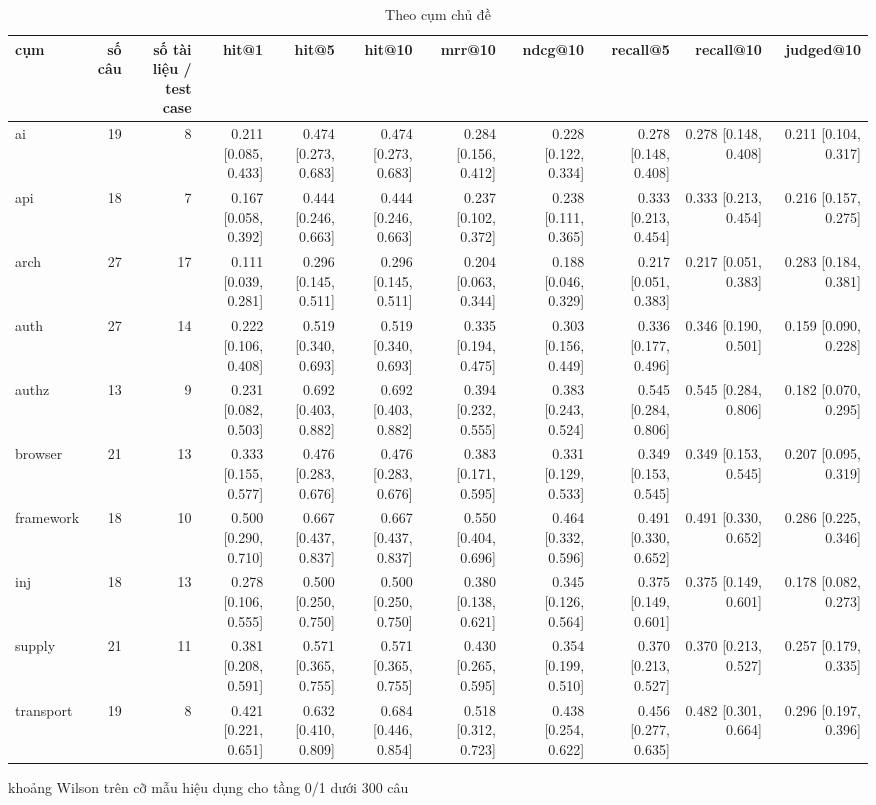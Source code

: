 \begin{table}[ht]
\centering
\caption{Theo cụm chủ đề}
\begin{tabular}{lrrrrrrrrrr}
\toprule
cụm & số câu & số tài liệu / test case & hit@1 & hit@5 & hit@10 & mrr@10 & ndcg@10 & recall@5 & recall@10 & judged@10 \\
\midrule
ai & 19 & 8 & 0.211 [0.085, 0.433] & 0.474 [0.273, 0.683] & 0.474 [0.273, 0.683] & 0.284 [0.156, 0.412] & 0.228 [0.122, 0.334] & 0.278 [0.148, 0.408] & 0.278 [0.148, 0.408] & 0.211 [0.104, 0.317] \\
api & 18 & 7 & 0.167 [0.058, 0.392] & 0.444 [0.246, 0.663] & 0.444 [0.246, 0.663] & 0.237 [0.102, 0.372] & 0.238 [0.111, 0.365] & 0.333 [0.213, 0.454] & 0.333 [0.213, 0.454] & 0.216 [0.157, 0.275] \\
arch & 27 & 17 & 0.111 [0.039, 0.281] & 0.296 [0.145, 0.511] & 0.296 [0.145, 0.511] & 0.204 [0.063, 0.344] & 0.188 [0.046, 0.329] & 0.217 [0.051, 0.383] & 0.217 [0.051, 0.383] & 0.283 [0.184, 0.381] \\
auth & 27 & 14 & 0.222 [0.106, 0.408] & 0.519 [0.340, 0.693] & 0.519 [0.340, 0.693] & 0.335 [0.194, 0.475] & 0.303 [0.156, 0.449] & 0.336 [0.177, 0.496] & 0.346 [0.190, 0.501] & 0.159 [0.090, 0.228] \\
authz & 13 & 9 & 0.231 [0.082, 0.503] & 0.692 [0.403, 0.882] & 0.692 [0.403, 0.882] & 0.394 [0.232, 0.555] & 0.383 [0.243, 0.524] & 0.545 [0.284, 0.806] & 0.545 [0.284, 0.806] & 0.182 [0.070, 0.295] \\
browser & 21 & 13 & 0.333 [0.155, 0.577] & 0.476 [0.283, 0.676] & 0.476 [0.283, 0.676] & 0.383 [0.171, 0.595] & 0.331 [0.129, 0.533] & 0.349 [0.153, 0.545] & 0.349 [0.153, 0.545] & 0.207 [0.095, 0.319] \\
framework & 18 & 10 & 0.500 [0.290, 0.710] & 0.667 [0.437, 0.837] & 0.667 [0.437, 0.837] & 0.550 [0.404, 0.696] & 0.464 [0.332, 0.596] & 0.491 [0.330, 0.652] & 0.491 [0.330, 0.652] & 0.286 [0.225, 0.346] \\
inj & 18 & 13 & 0.278 [0.106, 0.555] & 0.500 [0.250, 0.750] & 0.500 [0.250, 0.750] & 0.380 [0.138, 0.621] & 0.345 [0.126, 0.564] & 0.375 [0.149, 0.601] & 0.375 [0.149, 0.601] & 0.178 [0.082, 0.273] \\
supply & 21 & 11 & 0.381 [0.208, 0.591] & 0.571 [0.365, 0.755] & 0.571 [0.365, 0.755] & 0.430 [0.265, 0.595] & 0.354 [0.199, 0.510] & 0.370 [0.213, 0.527] & 0.370 [0.213, 0.527] & 0.257 [0.179, 0.335] \\
transport & 19 & 8 & 0.421 [0.221, 0.651] & 0.632 [0.410, 0.809] & 0.684 [0.446, 0.854] & 0.518 [0.312, 0.723] & 0.438 [0.254, 0.622] & 0.456 [0.277, 0.635] & 0.482 [0.301, 0.664] & 0.296 [0.197, 0.396] \\
\bottomrule
\end{tabular}
\par\smallskip\footnotesize khoảng Wilson trên cỡ mẫu hiệu dụng cho tầng 0/1 dưới 300 câu
\end{table}

